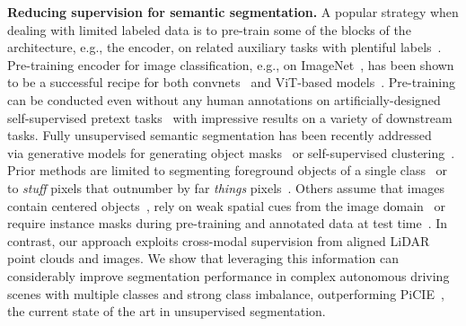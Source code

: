 \documentclass[runningheads]{llncs}
\newcommand{\paragraphcustom}[1]{\smallskip\noindent\textbf{#1}}
\begin{document}
\paragraphcustom{Reducing supervision for semantic segmentation.}
A popular strategy when dealing with limited labeled data is to pre-train some of the blocks of the architecture, e.g., the encoder, on related auxiliary tasks with plentiful labels~\cite{deng2009imagenet,zamir2018taskonomy}. Pre-training encoder for image classification, e.g., on ImageNet~\cite{deng2009imagenet}, has been shown to be a successful recipe for both convnets~\cite{chen2018encoder} and ViT-based models~\cite{Strudel_2021_ICCV}. Pre-training can be conducted even without any human annotations on artificially-designed self-supervised pretext tasks~\cite{caron2018deep,gidaris2021obow,Gidaris2018Unsupervised,grill2020bootstrap,he2020momentum,henaff2021efficient} with impressive results on a variety of downstream tasks.
Fully unsupervised semantic segmentation has been recently addressed ~\cite{bielski2019emergence,chen2019unsupervised,cho2021picie,hwang2019segsort,ji2019invariant,kanezaki2018unsupervised,ouali2020autoregressive,van2021unsupervised,zhang2020self} via generative models for generating object masks~\cite{bielski2019emergence,chen2019unsupervised,ouali2020autoregressive} or self-supervised clustering~\cite{cho2021picie,ji2019invariant}. 
Prior methods are limited to segmenting foreground objects of a single class~\cite{bielski2019emergence,chen2019unsupervised} or to \emph{stuff} pixels that outnumber by far \emph{things} pixels~\cite{ji2019invariant,ouali2020autoregressive}. Others assume that images contain centered objects~\cite{van2021unsupervised}, rely on weak spatial cues from the image domain~\cite{chen2019unsupervised,cho2021picie,ji2019invariant} or require instance masks during pre-training and annotated data at test time~\cite{hwang2019segsort}. In contrast, our approach exploits cross-modal supervision from aligned LiDAR point clouds and images. We show that leveraging this information can considerably improve segmentation performance in complex autonomous driving scenes with multiple classes and strong class imbalance, outperforming PiCIE~\cite{cho2021picie}, the current state of the art in unsupervised segmentation.
\end{document}
